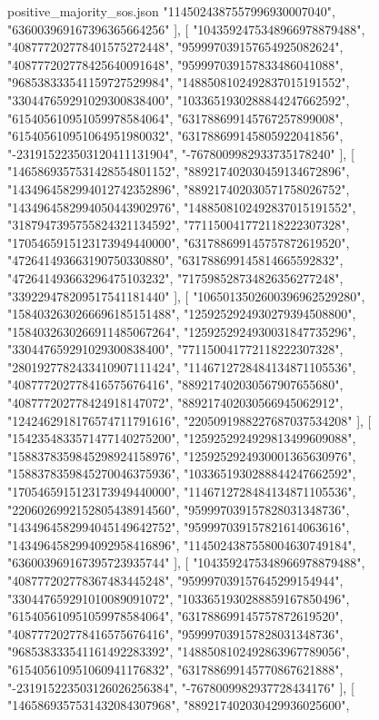 \begin{filecontents*}[overwrite]{positive_majority_sos.json}
    "1145024387557996930007040",
    "636003969167396365664256"
   ],
   [
    "1043592475348966978879488",
    "408777202778401575272448",
    "959997039157654925082624",
    "408777202778425640091648",
    "959997039157833486041088",
    "968538333541159727529984",
    "1488508102492837015191552",
    "330447659291029300838400",
    "1033651930288844247662592",
    "615405610951059978584064",
    "631788699145767257899008",
    "615405610951064951980032",
    "631788699145805922041856",
    "-231915223503120411131904",
    "-7678009982933735178240"
   ],
   [
    "1465869357531428554801152",
    "889217402030459134672896",
    "1434964582994012742352896",
    "889217402030571758026752",
    "1434964582994050443902976",
    "1488508102492837015191552",
    "3187947395755824321134592",
    "771150041772118222307328",
    "1705465915123173949440000",
    "631788699145757872619520",
    "472641493663190750330880",
    "631788699145814665592832",
    "472641493663296475103232",
    "717598528734826356277248",
    "339229478209517541181440"
   ],
   [
    "1065013502600396962529280",
    "1584032630266696185151488",
    "1259252924930279394508800",
    "1584032630266911485067264",
    "1259252924930031847735296",
    "330447659291029300838400",
    "771150041772118222307328",
    "2801927782433410907111424",
    "1146712728484134871105536",
    "408777202778416575676416",
    "889217402030567907655680",
    "408777202778424918147072",
    "889217402030566945062912",
    "1242462918176574711791616",
    "2205091988227687037534208"
   ],
   [
    "1542354833571477140275200",
    "1259252924929813499609088",
    "1588378359845298924158976",
    "1259252924930001365630976",
    "1588378359845270046375936",
    "1033651930288844247662592",
    "1705465915123173949440000",
    "1146712728484134871105536",
    "2206026992152805438914560",
    "959997039157828031348736",
    "1434964582994045149642752",
    "959997039157821614063616",
    "1434964582994092958416896",
    "1145024387558004630749184",
    "636003969167395723935744"
   ],
   [
    "1043592475348966978879488",
    "408777202778367483445248",
    "959997039157645299154944",
    "330447659291010089091072",
    "1033651930288859167850496",
    "615405610951059978584064",
    "631788699145757872619520",
    "408777202778416575676416",
    "959997039157828031348736",
    "968538333541161492283392",
    "1488508102492863967789056",
    "615405610951060941176832",
    "631788699145770867621888",
    "-231915223503126026256384",
    "-7678009982937728434176"
   ],
   [
    "1465869357531432084307968",
    "889217402030429936025600",

\end{filecontents*}
